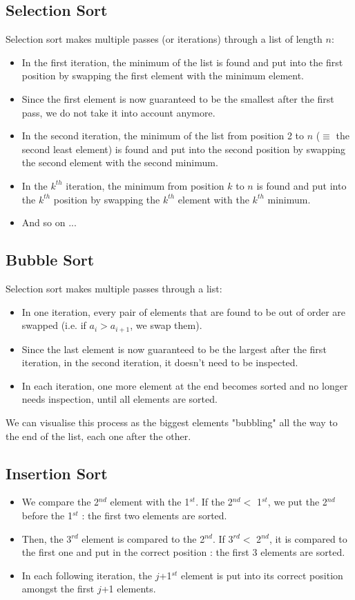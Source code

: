 \documentclass[10pt,a4paper]{book}
\begin{document}
\subsection{Selection Sort}
Selection sort makes multiple passes (or iterations) through a list of length $n$:
\begin{itemize}
\item In the first iteration, the minimum of the list is found and put into the first position by swapping the first element with the minimum element.
\item Since the first element is now guaranteed to be the smallest after the first pass, we do not take it into account anymore.
\item In the second iteration, the minimum of the list from position 2 to $n$ ($\equiv$ the second least element) is found and put into the second position by swapping the second element with the second minimum.
\item In the $k^{th}$ iteration, the minimum from position $k$ to $n$ is found and put into the $k^{th}$ position by swapping the $k^{th}$ element with the $k^{th}$ minimum.
\item And so on ...
\end{itemize}

\subsection{Bubble Sort}
Selection sort makes multiple passes through a list:
\begin{itemize}
\item In one iteration, every pair of elements that are found to be out of order are swapped (i.e. if $a_i > a_{i+1}$, we swap them).
\item Since the last element is now guaranteed to be the largest after the first iteration, in the second iteration, it doesn't need to be inspected.
\item In each iteration, one more element at the end becomes sorted and no longer needs inspection, until all elements are sorted.
\end{itemize}
We can visualise this process as the biggest elements "bubbling" all the way to the end of the list, each one after the other.

\subsection{Insertion Sort}
\begin{itemize}
\item We compare the 2$^{nd}$ element with the 1$^{st}$. If the 2$^{nd} <$ 1$^{st}$, we put the 2$^{nd}$ before the 1$^{st}$ : the first two elements are sorted.
\item Then, the 3$^{rd}$ element is compared to the 2$^{nd}$. If 3$^{rd} <$ 2$^{nd}$, it is compared to the first one and put in the correct position : the first 3 elements are sorted.
\item In each following iteration, the $j$+1$^{st}$ element is put into its correct position amongst the first $j$+1 elements.
\end{itemize}
\end{document}

